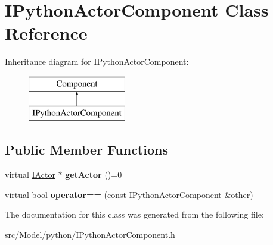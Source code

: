 \hypertarget{classIPythonActorComponent}{}\section{I\+Python\+Actor\+Component Class Reference}
\label{classIPythonActorComponent}
Inheritance diagram for I\+Python\+Actor\+Component\+:\begin{figure}[H]
\begin{center}
\leavevmode
\includegraphics[height=2.000000cm]{classIPythonActorComponent}
\end{center}
\end{figure}
\subsection*{Public Member Functions}
\begin{DoxyCompactItemize}
\item 
virtual \hyperlink{classIActor}{I\+Actor} $\ast$ {\bfseries get\+Actor} ()=0\hypertarget{classIPythonActorComponent_a87a6aa959b99ff34abeddfd9cb6652ea}{}\label{classIPythonActorComponent_a87a6aa959b99ff34abeddfd9cb6652ea}

\item 
virtual bool {\bfseries operator==} (const \hyperlink{classIPythonActorComponent}{I\+Python\+Actor\+Component} \&other)\hypertarget{classIPythonActorComponent_ae34fe13ffd9771e87b1f0d74e59afde4}{}\label{classIPythonActorComponent_ae34fe13ffd9771e87b1f0d74e59afde4}

\end{DoxyCompactItemize}


The documentation for this class was generated from the following file\+:\begin{DoxyCompactItemize}
\item 
src/\+Model/python/I\+Python\+Actor\+Component.\+h\end{DoxyCompactItemize}
